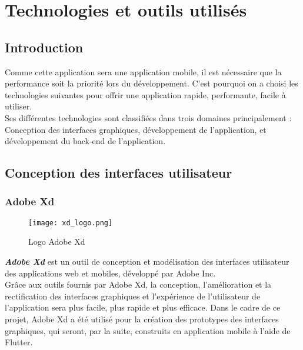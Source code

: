 \chapter{Technologies et outils utilisés}
\minitoc
\clearpage
\section{Introduction}
Comme cette application sera une application mobile, il est nécessaire que la performance soit la priorité lors du développement. C'est pourquoi on a choisi les technologies suivantes pour offrir une application rapide, performante, facile à utiliser.\\
\noindent Ses différentes technologies sont classifiées dans trois domaines principalement : Conception des interfaces graphiques, développement de l'application, et développement du back-end de l'application.\\
\section{Conception des interfaces utilisateur}
\subsection{Adobe Xd}
\vspace{1cm}
\begin{figure}[H]
    \centering
    \texttt{[image: xd\_logo.png]}
    \vspace{1cm}
    \captionsetup{justification=centering}

    \caption{Logo Adobe Xd}
    \label{fig:xd_logo}
\end{figure}
\textit{\textbf{Adobe Xd}} \cite{adobe_xd} est un outil de conception et modélisation des interfaces utilisateur des applications web et mobiles, développé par Adobe Inc.\\
\noindent Grâce aux outils fournis par Adobe Xd, la conception, l'amélioration et la rectification des interfaces graphiques et l'expérience de l'utilisateur de l'application sera plus facile, plus rapide et plus efficace.
\noindent Dans le cadre de ce projet, Adobe Xd a été utilisé pour la création des prototypes des interfaces graphiques, qui seront, par la suite, construits en application mobile à l'aide de Flutter.

